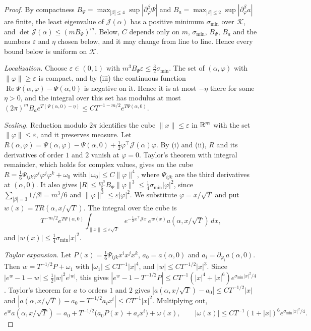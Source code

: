 \begin{proof}
By compactness
$B_\Psi=\max_{|\beta|\le4}\sup|\partial^\beta_\varphi\Psi|$ and
$B_a=\max_{|\beta|\le2}\sup|\partial^\beta_\varphi a|$ are finite, the least
eigenvalue of $\mathcal J(\alpha)$ has a positive minimum $\sigma_{\min}$ over
$\mathcal K$, and $\det\mathcal J(\alpha)\le(mB_\Psi)^m$. Below, $C$ depends
only on $m$, $\sigma_{\min}$, $B_\Psi$, $B_a$ and the numbers $\varepsilon$ and
$\eta$ chosen below, and it may change from line to line. Hence every bound
below is uniform on $\mathcal K$.

\emph{Localization.} Choose $\varepsilon\in(0,1)$ with
$m^3B_\Psi\varepsilon\le\frac32\sigma_{\min}$. The set of $(\alpha,\varphi)$ with
$\lVert\varphi\rVert\ge\varepsilon$ is compact, and by (iii) the continuous
function $\operatorname{Re}\Psi(\alpha,\varphi)-\Psi(\alpha,0)$ is negative on
it. Hence it is at most $-\eta$ there for some $\eta>0$, and the integral over
this set has modulus at most
$(2\pi)^mB_ae^{T(\Psi(\alpha,0)-\eta)}\le CT^{-1-m/2}e^{T\Psi(\alpha,0)}$.

\emph{Scaling.} Reduction modulo $2\pi$ identifies the cube
$\lVert x\rVert\le\varepsilon$ in $\mathbb{R}^m$ with the set
$\lVert\varphi\rVert\le\varepsilon$, and it preserves measure. Let
$R(\alpha,\varphi)=\Psi(\alpha,\varphi)-\Psi(\alpha,0)
+\frac12\varphi^\top\mathcal J(\alpha)\varphi$. By (i) and (ii), $R$ and its
derivatives of order $1$ and $2$ vanish at $\varphi=0$. Taylor's theorem with
integral remainder, which holds for complex values, gives on the cube
$R=\frac16\Psi_{ijk}\varphi^i\varphi^j\varphi^k+\omega_0$ with
$|\omega_0|\le C\lVert\varphi\rVert^4$, where $\Psi_{ijk}$ are the third
derivatives at $(\alpha,0)$. It also gives
$|R|\le\frac{m^3}6B_\Psi\lVert\varphi\rVert^3\le\frac14\sigma_{\min}|\varphi|^2$,
since $\sum_{|\beta|=3}1/\beta!=m^3/6$ and
$\lVert\varphi\rVert^3\le\varepsilon|\varphi|^2$. We substitute
$\varphi=x/\sqrt T$ and put $w(x)=TR(\alpha,x/\sqrt T)$. The integral over the
cube is
\[
T^{-m/2}e^{T\Psi(\alpha,0)}\int_{\lVert x\rVert\le\varepsilon\sqrt T}
e^{-\frac12x^\top\mathcal Jx}\,e^{w(x)}a(\alpha,x/\sqrt T)\,dx,
\]
and $|w(x)|\le\frac14\sigma_{\min}|x|^2$.

\emph{Taylor expansion.} Let $P(x)=\frac16\Psi_{ijk}x^ix^jx^k$,
$a_0=a(\alpha,0)$ and $a_i=\partial_{\varphi_i}a(\alpha,0)$. Then
$w=T^{-1/2}P+\omega_1$ with $|\omega_1|\le CT^{-1}|x|^4$, and
$|w|\le CT^{-1/2}|x|^3$. Since $|e^w-1-w|\le\frac12|w|^2e^{|w|}$, this gives
$|e^w-1-T^{-1/2}P|\le CT^{-1}(|x|^4+|x|^6)e^{\sigma_{\min}|x|^2/4}$. Taylor's
theorem for $a$ to orders $1$ and $2$ gives
$|a(\alpha,x/\sqrt T)-a_0|\le CT^{-1/2}|x|$ and
$|a(\alpha,x/\sqrt T)-a_0-T^{-1/2}a_ix^i|\le CT^{-1}|x|^2$. Multiplying out,
\[
e^{w}a(\alpha,x/\sqrt T)=a_0+T^{-1/2}\bigl(a_0P(x)+a_ix^i\bigr)+\omega(x),
\qquad|\omega(x)|\le CT^{-1}(1+|x|)^6e^{\sigma_{\min}|x|^2/4}.
\]


\end{proof}
